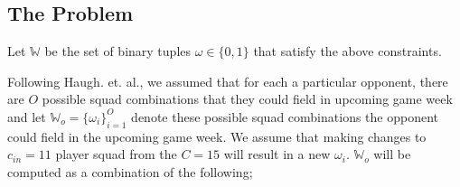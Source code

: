 \documentclass[12pt,oneside,a4paper]{book}
\theoremstyle{definition}
\theoremstyle{remark}
\begin{document}
				\subsection{The Problem}

					Let $\mathbb{W}$ be the set of binary tuples $\omega \in  \{0,1\}$ that satisfy the above constraints.

					Following Haugh. et. al.\cite{haugh2021play}, we assumed that for each a particular opponent, there are $O$  possible squad combinations that they could field in upcoming game week and let $\mathbb{W}_o = \{\omega_i\}^O_{i=1}$ denote these possible squad combinations the opponent could field in the upcoming game week.
					We assume that making changes to $c_{in}=11$ player squad from the $C=15$ will result in a new $\omega_i$. $\mathbb{W}_{o}$ will be computed as a combination of the following;
\end{document}
